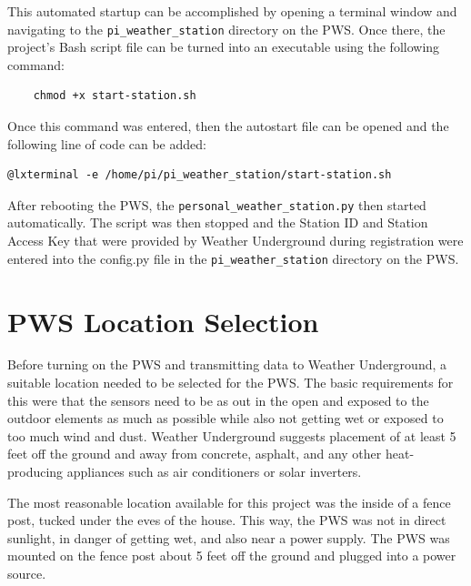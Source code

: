 \documentclass[sigconf]{acmart}
\begin{document}
This automated startup can be accomplished by opening a terminal window and navigating to the \verb|pi_weather_station| directory on the PWS. Once there, the project's Bash script file can be turned into an executable using the following command:


\begin{verbatim}
    chmod +x start-station.sh
\end{verbatim}


Once this command was entered, then the autostart file can be opened and the following line of code can be added:


\begin{verbatim}
@lxterminal -e /home/pi/pi_weather_station/start-station.sh
\end{verbatim}



After rebooting the PWS, the \verb|personal_weather_station.py| then started automatically. The script was then stopped and the Station ID and Station Access Key that were provided by Weather Underground during registration were entered into the config.py file in the \verb|pi_weather_station| directory on the PWS.

\section{PWS Location Selection}

Before turning on the PWS and transmitting data to Weather Underground, a suitable location needed to be selected for the PWS. The basic requirements for this were that the sensors need to be as out in the open and exposed to the outdoor elements as much as possible while also not getting wet or exposed to too much wind and dust. Weather Underground suggests placement of at least 5 feet off the ground and away from concrete, asphalt, and any other heat-producing appliances such as air conditioners or solar inverters. 

The most reasonable location available for this project was the inside of a fence post, tucked under the eves of the house. This way, the PWS was not in direct sunlight, in danger of getting wet, and also near a power supply. The PWS was mounted on the fence post about 5 feet off the ground and plugged into a power source. 
\end{document}
